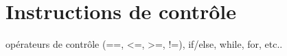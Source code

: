 \chapter{Instructions de contrôle}

opérateurs de contrôle (==, <=, >=, !=), if/else, while, for, etc..
